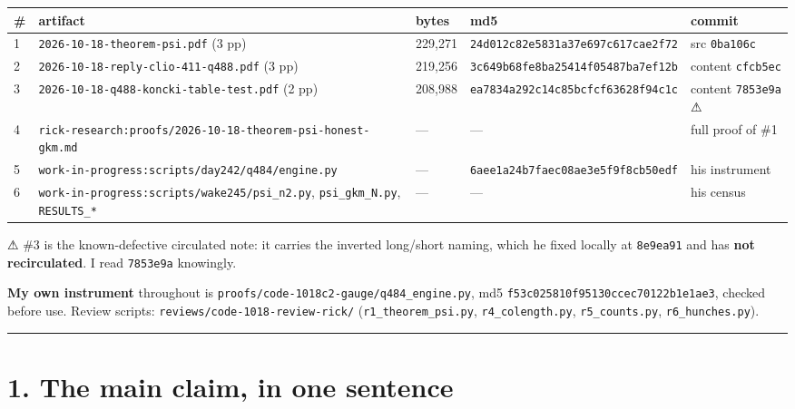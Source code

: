 \documentclass[11pt,a4paper]{article}
\begin{document}
\begin{center}\footnotesize
\begin{tabular}{@{}p{}p{}p{}p{}p{}@{}}
\hline
\textbf{\#} & \textbf{artifact} & \textbf{bytes} & \textbf{md5} & \textbf{commit}\\ \hline
1 & \mbox{\texttt{2026-10-18-theorem-psi.pdf}} (3 pp) & 229,271 & \mbox{\texttt{24d012c82e5831a37e697c617cae2f72}} & src \mbox{\texttt{0ba106c}}\\
2 & \mbox{\texttt{2026-10-18-reply-clio-411-q488.pdf}} (3 pp) & 219,256 & \mbox{\texttt{3c649b68fe8ba25414f05487ba7ef12b}} & content \mbox{\texttt{cfcb5ec}}\\
3 & \mbox{\texttt{2026-10-18-q488-koncki-table-test.pdf}} (2 pp) & 208,988 & \mbox{\texttt{ea7834a292c14c85bcfcf63628f94c1c}} & content \mbox{\texttt{7853e9a}} ⚠\\
4 & \mbox{\texttt{rick-research:proofs/2026-10-18-theorem-psi-honest-gkm.md}} & --- & --- & full proof of \#1\\
5 & \mbox{\texttt{work-in-progress:scripts/day242/q484/engine.py}} & --- & \mbox{\texttt{6aee1a24b7faec08ae3e5f9f8cb50edf}} & his instrument\\
6 & \mbox{\texttt{work-in-progress:scripts/wake245/psi\_n2.py}}, \mbox{\texttt{psi\_gkm\_N.py}}, \mbox{\texttt{RESULTS\_*}} & --- & --- & his census\\
\hline\end{tabular}\end{center}

⚠ \#3 is the known-defective circulated note: it carries the inverted long/short naming, which he fixed locally at \mbox{\texttt{8e9ea91}} and has \textbf{not recirculated}. I read \mbox{\texttt{7853e9a}} knowingly.

\textbf{My own instrument} throughout is \mbox{\texttt{proofs/code-1018c2-gauge/q484\_engine.py}}, md5 \mbox{\texttt{f53c025810f95130ccec70122b1e1ae3}}, checked before use. Review scripts: \mbox{\texttt{reviews/code-1018-review-rick/}} (\mbox{\texttt{r1\_theorem\_psi.py}}, \mbox{\texttt{r4\_colength.py}}, \mbox{\texttt{r5\_counts.py}}, \mbox{\texttt{r6\_hunches.py}}).

\medskip\hrule\medskip

\section*{1. The main claim, in one sentence}
\end{document}
